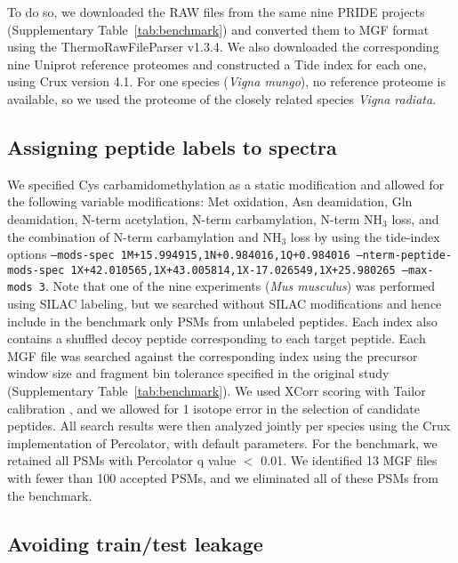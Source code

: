 \documentclass{article}
\begin{document}


To do so, we downloaded the RAW files from the same nine PRIDE projects (Supplementary Table~\ref{tab:benchmark}) and converted them to MGF format using the ThermoRawFileParser v1.3.4.
We also downloaded the corresponding nine Uniprot reference proteomes and constructed a Tide index for each one, using Crux version 4.1.
For one species (\textit{Vigna mungo}), no reference proteome is available, so we used the proteome of the closely related species \textit{Vigna radiata}.

\subsection*{Assigning peptide labels to spectra}

We specified Cys carbamidomethylation as a static modification and allowed for the following variable modifications: Met oxidation, Asn deamidation, Gln deamidation, N-term acetylation, N-term carbamylation, N-term NH$_{3}$ loss, and the combination of N-term carbamylation and NH$_{3}$ loss by using the tide-index options {\tt --mods-spec 1M+15.994915,\allowbreak 1N+0.984016,\allowbreak 1Q+0.984016 --nterm-peptide-mods-spec 1X+42.010565,\allowbreak 1X+43.005814,\allowbreak 1X-17.026549,\allowbreak 1X+25.980265 --max-mods 3}.
Note that one of the nine experiments (\textit{Mus musculus}) was performed using SILAC labeling, but we searched without SILAC modifications and hence include in the benchmark only PSMs from unlabeled peptides.
Each index also contains a shuffled decoy peptide corresponding to each target peptide.
Each MGF file was searched against the corresponding index using the precursor window size and fragment bin tolerance specified in the original study (Supplementary Table~\ref{tab:benchmark}).
We used XCorr scoring with Tailor calibration \cite{sulimov2020tailor}, and we allowed for 1 isotope error in the selection of candidate peptides.
All search results were then analyzed jointly per species using the Crux implementation of Percolator, with default parameters.
For the benchmark, we retained all PSMs with Percolator q value $<$ 0.01.
We identified 13 MGF files with fewer than 100 accepted PSMs, and we eliminated all of these PSMs from the benchmark.

\subsection*{Avoiding train/test leakage}
\end{document}
